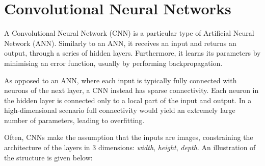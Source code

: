\section{Convolutional Neural Networks}
\label{sec:cnn}
A Convolutional Neural Network (CNN) is a particular type of Artificial Neural Network (ANN). Similarly to an ANN, it receives an input and returns an output, through a series of hidden layers. Furthermore, it learns its parameters by minimising an error function, usually by performing backpropagation. 

As opposed to an ANN, where each input is typically fully connected with neurons of the next layer, a CNN instead has sparse connectivity. Each neuron in the hidden layer is connected only to a local part of the input and output. In a high-dimensional scenario full connectivity would yield an extremely large number of parameters, leading to overfitting.

Often, CNNs make the assumption that the inputs are images, constraining the architecture of the layers in 3 dimensions: \textit{width}, \textit{height}, \textit{depth}. An illustration of the structure is given below:

